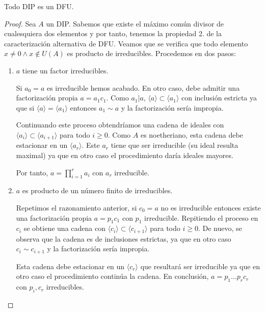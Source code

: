 \begin{theorem}
Todo DIP es un DFU. 
\end{theorem}
\begin{proof}
Sea $A$ un DIP. Sabemos que existe el máximo común divisor de cualesquiera dos elementos y por tanto, tenemos la propiedad 2. de la caracterización alternativa de DFU. Veamos que se verifica que todo elemento $x \neq 0 \land x \notin U(A)$ es producto de irreducibles. Procedemos en dos pasos:

\begin{enumerate}
\item $a$ tiene un factor irreducibles. 

Si $a_0 = a$ es irreducible hemos acabado. En otro caso, debe admitir una factorización propia $a = a_1c_1$. Como $a_1|a$, $\langle a \rangle \subset \langle a_1 \rangle$ con inclusión estricta ya que si $\langle a \rangle = \langle a_1 \rangle$ entonces $a_1 \sim a$ y la factorización sería impropia. 

Continuando este proceso obtendríamos una cadena de ideales con $\langle a_i \rangle \subset \langle a_{i+1} \rangle$ para todo $i \ge 0$. Como $A$ es noetheriano, esta cadena debe estacionar en un $\langle a_r \rangle$. Este $a_r$ tiene que ser irreducible (su ideal resulta maximal) ya que en otro caso el procedimiento daría ideales mayores. 

Por tanto, $a = \prod_{i = 1}^r a_i$ con $a_r$ irreducible. 

\item $a$ es producto de un número finito de irreducibles. 

Repetimos el razonamiento anterior, si $c_0 = a$ no es irreducible entonces existe una factorización propia $a = p_1c_1$ con $p_1$ irreducible. Repitiendo el proceso en $c_i$ se obtiene una cadena con $\langle c_i \rangle \subset \langle c_{i+1} \rangle$ para todo $i \ge 0$. De nuevo, se observa que la cadena es de inclusiones estrictas, ya que en otro caso $c_i \sim c_{i+1}$ y la factorización sería impropia. 

Esta cadena debe estacionar en un $\langle c_{r} \rangle$ que resultará ser irreducible ya que en otro caso el procedimiento continúa la cadena. En conclusión, $a = p_1 \ldots p_r c_r$ con $p_i,c_r$ irreducibles. 
\end{enumerate}
\end{proof}









